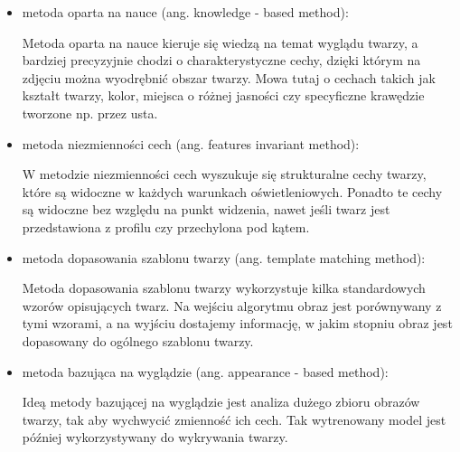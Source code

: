 \documentclass[a4paper,twoside,12pt]{book}
\begin{document}
    \begin{itemize}
        \item metoda oparta na nauce (ang. knowledge - based method):

        Metoda oparta na nauce kieruje się wiedzą na temat wyglądu twarzy, a
        bardziej precyzyjnie chodzi o charakterystyczne cechy,
        dzięki którym na zdjęciu można wyodrębnić obszar twarzy.
        Mowa tutaj o cechach takich jak kształt twarzy, kolor, miejsca o różnej jasności czy specyficzne krawędzie
        tworzone np. przez
        usta.
        \item metoda niezmienności cech (ang. features invariant method):

        W metodzie niezmienności cech wyszukuje się strukturalne cechy twarzy, które są widoczne w każdych warunkach
        oświetleniowych.
        Ponadto te cechy są widoczne bez względu na punkt widzenia, nawet jeśli twarz jest przedstawiona
        z profilu czy przechylona pod kątem.
        \item metoda dopasowania szablonu twarzy (ang. template matching method):

        Metoda dopasowania szablonu twarzy wykorzystuje kilka standardowych wzorów opisujących twarz.
        Na wejściu algorytmu obraz jest porównywany z tymi wzorami, a
        na wyjściu dostajemy informację, w jakim stopniu obraz jest dopasowany do ogólnego szablonu twarzy.
        \item metoda bazująca na wyglądzie (ang. appearance - based method):

        Ideą metody bazującej na wyglądzie jest analiza dużego zbioru obrazów twarzy, tak aby wychwycić zmienność
        ich cech.
        Tak wytrenowany model jest później wykorzystywany do wykrywania twarzy.
    \end{itemize}

\end{document}
